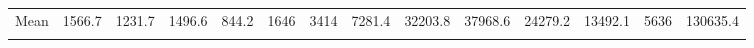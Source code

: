 \begin{longtable}[t]{crrrrrrrrrrrrr}
Mean & 1566.7 & 1231.7 & 1496.6 & 844.2 & 1646 & 3414 & 7281.4 & 32203.8 & 37968.6 & 24279.2 & 13492.1 & 5636 & 130635.4\\
\cellcolor{green}{Min} & \cellcolor{green}{342.5} & \cellcolor{green}{513.8} & \cellcolor{green}{-1010.9} & \cellcolor{green}{211.9} & \cellcolor{green}{-487.5} & \cellcolor{green}{-228.5} & \cellcolor{green}{1240.7} & \cellcolor{green}{31387.1} & \cellcolor{green}{12400.8} & \cellcolor{green}{4478} & \cellcolor{green}{2734.6} & \cellcolor{green}{-659.8} & \cellcolor{green}{69787.6}\\*
\end{longtable}

